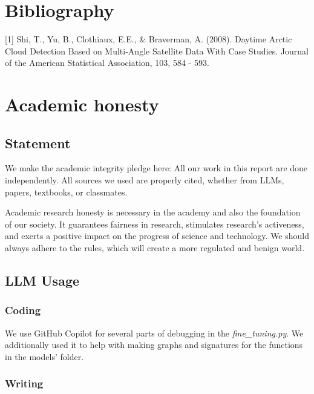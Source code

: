 \documentclass[10pt,letterpaper]{article}
\begin{document}
\section{Bibliography}

[1] Shi, T., Yu, B., Clothiaux, E.E., \& Braverman, A. (2008). Daytime Arctic Cloud Detection Based on Multi-Angle Satellite Data With Case Studies. Journal of the American Statistical Association, 103, 584 - 593.


\appendix
\section{Academic honesty}
\subsection{Statement}

We make the academic integrity pledge here: All our work in this report are done independently. All sources we used are properly cited, whether from LLMs, papers, textbooks, or classmates.

Academic research honesty is necessary in the academy and also the foundation of our society. It guarantees
fairness in research, stimulates research’s activeness, and exerts a positive impact on the progress of science
and technology. We should always adhere to the rules, which will create a more regulated and benign world.

\subsection{LLM Usage}


\subsubsection*{Coding}

We use GitHub Copilot for several parts of debugging in the \textit{fine\_tuning.py}. We additionally used it to help with making graphs and signatures for the functions in the models' folder.


\subsubsection*{Writing}
\end{document}
